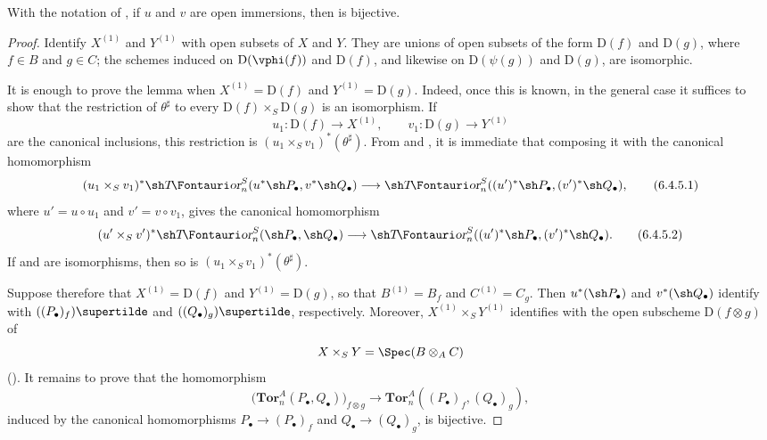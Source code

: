 \begin{lemma}[6.4.5]
\label{III.6.4.5}
With the notation of , if $u$ and $v$ are open
immersions, then  is bijective.
\end{lemma}

\begin{proof}
Identify $X^{(1)}$ and $Y^{(1)}$ with open subsets of $X$ and $Y$.
They are unions of open subsets of the form $\mathrm D(f)$ and
$\mathrm D(g)$, where $f\in B$ and $g\in C$; the schemes induced
on $\mathrm D(\vphi(f))$ and $\mathrm D(f)$, and likewise on
$\mathrm D(\psi(g))$ and $\mathrm D(g)$, are isomorphic.

It is enough to prove the lemma when
$X^{(1)}=\mathrm D(f)$ and $Y^{(1)}=\mathrm D(g)$.  Indeed, once
this is known, in the general case it suffices to show that the
restriction of $\theta^\sharp$ to every
$\mathrm D(f)\times_S\mathrm D(g)$ is an isomorphism.  If
\[
  u_1:\mathrm D(f)\longrightarrow X^{(1)},
  \qquad
  v_1:\mathrm D(g)\longrightarrow Y^{(1)}
\]
are the canonical inclusions, this restriction is
$(u_1\times_Sv_1)^*(\theta^\sharp)$.  From
 and , it is immediate that
composing it with the canonical homomorphism
\[
  (u_1\times_Sv_1)^*
  \shTor_n^S(u^*\sh P_\bullet,v^*\sh Q_\bullet)
  \longrightarrow
  \shTor_n^S((u')^*\sh P_\bullet,(v')^*\sh Q_\bullet),
  \tag{6.4.5.1}\label{III.6.4.5.1}
\]
where $u'=u\circ u_1$ and $v'=v\circ v_1$, gives the canonical
homomorphism
\[
  (u'\times_Sv')^*
  \shTor_n^S(\sh P_\bullet,\sh Q_\bullet)
  \longrightarrow
  \shTor_n^S((u')^*\sh P_\bullet,(v')^*\sh Q_\bullet).
  \tag{6.4.5.2}\label{III.6.4.5.2}
\]
If  and  are isomorphisms,
then so is $(u_1\times_Sv_1)^*(\theta^\sharp)$.

Suppose therefore that $X^{(1)}=\mathrm D(f)$ and
$Y^{(1)}=\mathrm D(g)$, so that $B^{(1)}=B_f$ and
$C^{(1)}=C_g$.  Then $u^*(\sh P_\bullet)$ and
$v^*(\sh Q_\bullet)$ identify with
$((P_\bullet)_f)\supertilde$ and
$((Q_\bullet)_g)\supertilde$, respectively.  Moreover,
$X^{(1)}\times_SY^{(1)}$ identifies with the open subscheme
$\mathrm D(f\otimes g)$ of
\[
  X\times_SY=\Spec(B\otimes_AC)
\]
().  It remains to prove that the
homomorphism
\[
  \bigl(\mathbf{Tor}_n^A(P_\bullet,Q_\bullet)\bigr)_{f\otimes g}
  \longrightarrow
  \mathbf{Tor}_n^A((P_\bullet)_f,(Q_\bullet)_g),
  \tag{6.4.5.3}\label{III.6.4.5.3}
\]
induced by the canonical homomorphisms
$P_\bullet\longrightarrow(P_\bullet)_f$ and
$Q_\bullet\longrightarrow(Q_\bullet)_g$, is bijective.


\end{proof}
